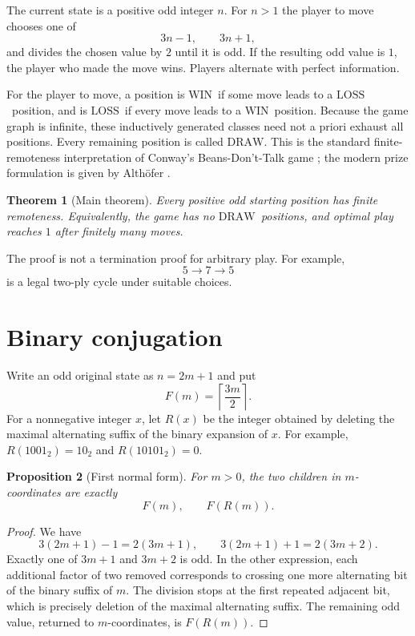 \documentclass[11pt]{article}
\newtheorem{theorem}{Theorem}[section]
\newtheorem{proposition}[theorem]{Proposition}
\newcommand{\WIN}{\ensuremath{\mathrm{WIN}}}
\newcommand{\LOSS}{\ensuremath{\mathrm{LOSS}}}
\newcommand{\DRAW}{\ensuremath{\mathrm{DRAW}}}
\begin{document}
The current state is a positive odd integer $n$. For $n>1$ the player to move
chooses one of
\[
  3n-1,\qquad 3n+1,
\]
and divides the chosen value by $2$ until it is odd. If the resulting odd value
is $1$, the player who made the move wins. Players alternate with perfect
information.

For the player to move, a position is \WIN\ if some move leads to a \LOSS\
position, and is \LOSS\ if every move leads to a \WIN\ position. Because the
game graph is infinite, these inductively generated classes need not a priori
exhaust all positions. Every remaining position is called \DRAW. This is the
standard finite-remoteness interpretation of Conway's Beans-Don't-Talk game
\cite{Guy1986,Guy1996}; the modern prize formulation is given by Alth\"ofer
\cite{AlthoferPage,Althofer2024}.

\begin{theorem}[Main theorem]\label{thm:main}
Every positive odd starting position has finite remoteness. Equivalently, the
game has no \DRAW\ positions, and optimal play reaches $1$ after finitely many
moves.
\end{theorem}

The proof is not a termination proof for arbitrary play. For example,
\[
  5\longrightarrow7\longrightarrow5
\]
is a legal two-ply cycle under suitable choices.

\section{Binary conjugation}

Write an odd original state as $n=2m+1$ and put
\[
  F(m)=\left\lceil\frac{3m}{2}\right\rceil.
\]
For a nonnegative integer $x$, let $R(x)$ be the integer obtained by deleting
the maximal alternating suffix of the binary expansion of $x$. For example,
$R(1001_2)=10_2$ and $R(10101_2)=0$.

\begin{proposition}[First normal form]\label{prop:firstnormal}
For $m>0$, the two children in $m$-coordinates are exactly
\[
  F(m),\qquad F(R(m)).
\]
\end{proposition}

\begin{proof}
We have
\[
  3(2m+1)-1=2(3m+1),\qquad
  3(2m+1)+1=2(3m+2).
\]
Exactly one of $3m+1$ and $3m+2$ is odd. In the other expression, each
additional factor of two removed corresponds to crossing one more alternating
bit of the binary suffix of $m$. The division stops at the first repeated
adjacent bit, which is precisely deletion of the maximal alternating suffix.
The remaining odd value, returned to $m$-coordinates, is $F(R(m))$.
\end{proof}
\end{document}
